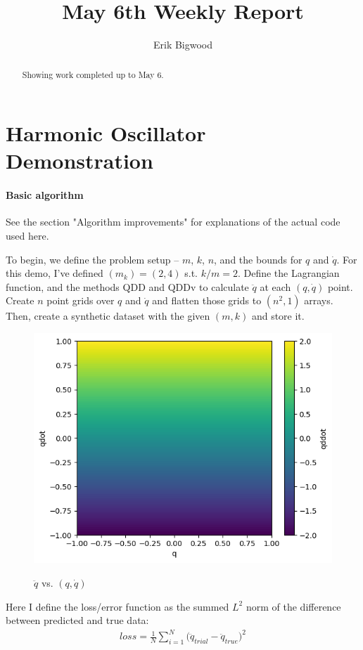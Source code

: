 \documentclass[]{article}
\title{May 6th Weekly Report}
\author{Erik Bigwood}
\begin{document}
\maketitle

\begin{abstract}
Showing work completed up to May 6.
\end{abstract}

\tableofcontents
\newpage

\section{Harmonic Oscillator Demonstration}
\paragraph{Basic algorithm}
See the section "Algorithm improvements" for explanations of the actual code used here.

To begin, we define the problem setup -- $m$, $k$, $n$, and the bounds for $q$ and $\dot{q}$. For this demo, I've defined $(m_k) = (2,4)$ s.t. $k/m=2$. Define the Lagrangian function, and the methods QDD and QDDv to calculate $\ddot{q}$ at each $(q,\dot{q})$ point. Create $n$ point grids over $q$ and $\dot{q}$ and flatten those grids to $(n^2,1)$ arrays. Then, create a synthetic dataset with the given $(m,k)$ and store it.

\begin{figure}[H]
	\caption{$\ddot{q}$ vs. $(q,\dot{q})$}
	\centering
	\includegraphics[scale=0.55]{qddot-vs-q-qdot.png}
	\label{fig:qddot-vs-q-qdot}
\end{figure}
Here I define the loss/error function as the summed $L^2$ norm of the difference between predicted and true data:
\begin{eqnarray}
	loss = \frac{1}{N}\sum_{i=1}^N \Big( \ddot{q}_{trial} - \ddot{q}_{true}\Big)^2
\end{eqnarray}
\end{document}
